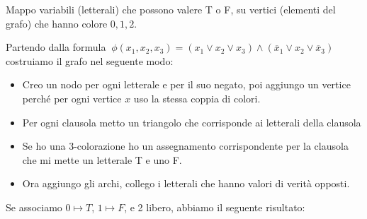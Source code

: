 \documentclass[a4paper]{article}
\theoremstyle{definition}
\begin{document}
 		Mappo variabili (letterali) che possono valere T o F, su vertici (elementi del grafo) che hanno colore $ 0, 1, 2 $.
 		
 		 
 		 Partendo dalla formula $ \ \phi(x_1, x_2, x_3) = (x_1\vee x_2\vee x_3)\wedge(\overline{x}_1\vee x_2\vee\overline{x}_3) \ $ costruiamo il grafo nel seguente modo:
 		 \begin{itemize}
 		 	\item Creo un nodo per ogni letterale e per il suo negato, poi aggiungo un vertice perché per ogni vertice $ x $ uso la stessa coppia di colori.
 		 	\item Per ogni clausola metto un triangolo che corrisponde ai letterali della clausola
 		 	\item Se ho una 3-colorazione ho un assegnamento corrispondente per la clausola che mi mette un letterale T e uno F.
 		 	\item Ora aggiungo gli archi, collego i letterali che hanno valori di verità opposti.
 		 \end{itemize}

		Se associamo $ 0\mapsto T $, $ 1\mapsto F $, e 2 libero, abbiamo il seguente risultato:
 		 
\end{document}
